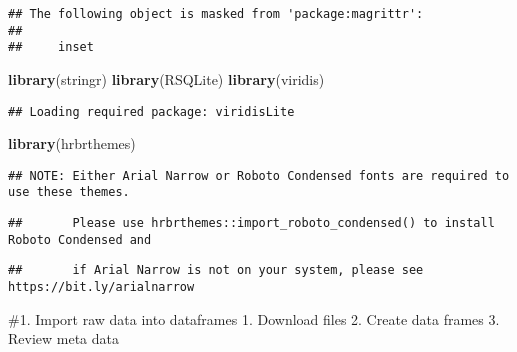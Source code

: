 \documentclass[]{article}
\newenvironment{Shaded}{\begin{snugshade}}{\end{snugshade}}
\newcommand{\KeywordTok}[1]{\textcolor[rgb]{0.13,0.29,0.53}{\textbf{#1}}}
\newcommand{\NormalTok}[1]{#1}
\begin{document}
\begin{verbatim}
## The following object is masked from 'package:magrittr':
## 
##     inset
\end{verbatim}

\begin{Shaded}
\begin{Highlighting}[]
\KeywordTok{library}\NormalTok{(stringr)}
\KeywordTok{library}\NormalTok{(RSQLite)}
\KeywordTok{library}\NormalTok{(viridis)}
\end{Highlighting}
\end{Shaded}

\begin{verbatim}
## Loading required package: viridisLite
\end{verbatim}

\begin{Shaded}
\begin{Highlighting}[]
\KeywordTok{library}\NormalTok{(hrbrthemes)}
\end{Highlighting}
\end{Shaded}

\begin{verbatim}
## NOTE: Either Arial Narrow or Roboto Condensed fonts are required to use these themes.
\end{verbatim}

\begin{verbatim}
##       Please use hrbrthemes::import_roboto_condensed() to install Roboto Condensed and
\end{verbatim}

\begin{verbatim}
##       if Arial Narrow is not on your system, please see https://bit.ly/arialnarrow
\end{verbatim}

\#1. Import raw data into dataframes 1. Download files 2. Create data
frames 3. Review meta data
\end{document}
